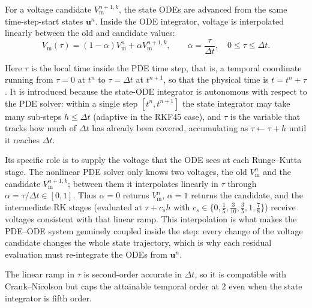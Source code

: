 \documentclass[11pt,a4paper]{article}
\newcommand{\Vm}{V_{\text{m}}}
\begin{document}
For a voltage candidate $\Vm^{n+1,k}$, the state ODEs are advanced from the
same time-step-start states $\mathbf{u}^n$. Inside the ODE integrator, voltage
is interpolated linearly between the old and candidate values:
\begin{equation}
  \Vm(\tau)
  =
  (1-\alpha)\Vm^n+\alpha \Vm^{n+1,k},
  \qquad
  \alpha=\frac{\tau}{\Delta t},\quad 0\le \tau\le \Delta t.
  \label{eq:ode-vm-interpolation}
\end{equation}

Here $\tau$ is the local time inside the PDE time step, that is, a temporal
coordinate running from $\tau=0$ at $t^n$ to $\tau=\Delta t$ at $t^{n+1}$, so
that the physical time is $t=t^n+\tau$. It is introduced because the state-ODE
integrator is autonomous with respect to the PDE solver: within a single step
$[t^n,t^{n+1}]$ the state integrator may take many sub-steps $h\le\Delta t$
(adaptive in the RKF45 case), and $\tau$ is the variable that tracks how
much of $\Delta t$ has already been covered, accumulating as
$\tau\leftarrow\tau+h$ until it reaches $\Delta t$.

Its specific role is to supply the voltage that the ODE sees at each
Runge--Kutta stage. The nonlinear PDE solver only knows two voltages, the old
$\Vm^n$ and the candidate $\Vm^{n+1,k}$; between them it interpolates linearly
in $\tau$ through $\alpha=\tau/\Delta t\in[0,1]$. Thus $\alpha=0$ returns
$\Vm^n$, $\alpha=1$ returns the candidate, and the intermediate RK stages
(evaluated at $\tau+c_sh$ with
$c_s\in\{0,\tfrac15,\tfrac3{10},\tfrac35,1,\tfrac78\}$) receive voltages
consistent with that linear ramp. This interpolation is what makes the PDE--ODE
system genuinely coupled inside the step: every change of the voltage candidate
changes the whole state trajectory, which is why each residual evaluation must
re-integrate the ODEs from $\mathbf{u}^n$.

The linear ramp in $\tau$ is second-order accurate in $\Delta t$, so it is
compatible with Crank--Nicolson but caps the attainable temporal order at 2 even
when the state integrator is fifth order.
\end{document}
